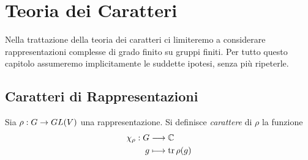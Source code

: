\chapter{Teoria dei Caratteri}
Nella trattazione della teoria dei caratteri ci limiteremo a considerare rappresentazioni complesse di grado finito su gruppi finiti. Per tutto questo capitolo assumeremo implicitamente le suddette ipotesi, senza più ripeterle.

\section{Caratteri di Rappresentazioni}

\begin{definition}
Sia $\rho:G\to GL(V)$ una rappresentazione. Si definisce \emph{carattere} di $\rho$ la funzione
\begin{align*}
\chi_\rho:G&\longrightarrow\mathbb{C}\\
g&\longmapsto\operatorname{tr}\rho(g)
\end{align*}
\end{definition}

